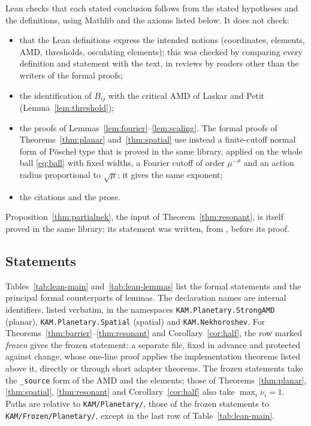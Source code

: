 Lean checks that each stated conclusion follows from the stated hypotheses and the definitions, using Mathlib
and the axioms listed below. It does not check:
\begin{itemize}
\item that the Lean definitions express the intended notions (coordinates, elements, AMD, thresholds,
  osculating elements); this was checked by comparing every definition and statement with the text, in reviews
  by readers other than the writers of the formal proofs;
\item the identification of $B_{ij}$ with the critical AMD of Laskar and Petit (Lemma~\ref{lem:threshold});
\item the proofs of Lemmas~\ref{lem:fourier}--\ref{lem:scaling}. The formal proofs of
  Theorems~\ref{thm:planar} and~\ref{thm:spatial} use instead a finite-cutoff normal form of Pöschel type
  \cite{Pos93} that is proved in the same library, applied on the whole ball \eqref{eq:ball} with fixed widths,
  a Fourier cutoff of order $\mu^{-\vartheta}$ and an action radius proportional to $\sqrt\mu$; it gives the
  same exponent;
\item the citations and the prose.
\end{itemize}
Proposition~\ref{thm:partialnek}, the input of Theorem~\ref{thm:resonant}, is itself proved in the same library;
its statement was written, from \cite[Theorem~4.4]{Nek77}, before its proof.

\subsection{Statements}

Tables~\ref{tab:lean-main} and~\ref{tab:lean-lemmas} list the formal statements and the principal formal
counterparts of lemmas. The declaration names are internal identifiers, listed verbatim, in the namespaces
\texttt{KAM.Planetary.StrongAMD} (planar), \texttt{KAM.Planetary.Spatial} (spatial) and \texttt{KAM.Nekhoroshev}.
For Theorems~\ref{thm:barrier}--\ref{thm:resonant} and Corollary~\ref{cor:half}, the row marked \emph{frozen}
gives the frozen statement: a separate file, fixed in advance and protected against change, whose one-line
proof applies the implementation theorems listed above it, directly or through short adapter theorems. The frozen statements take the \texttt{\_source}
form of the AMD and the elements; those of Theorems~\ref{thm:planar}, \ref{thm:spatial},
\ref{thm:resonant} and Corollary~\ref{cor:half} also take $\max_i\nu_i=1$. Paths are relative to \texttt{KAM/Planetary/}, those of
the frozen statements to \texttt{KAM/Frozen/Planetary/}, except in the last row of Table~\ref{tab:lean-main}.


